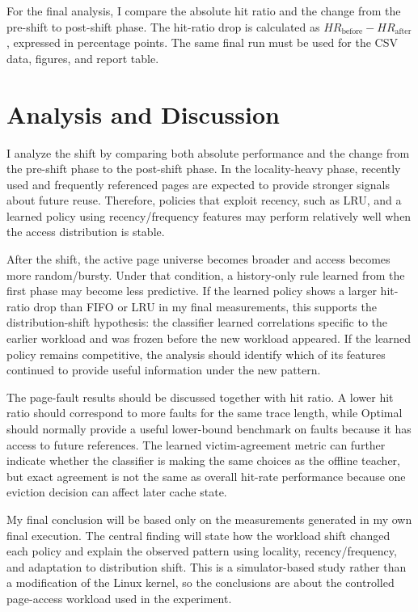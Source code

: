 \documentclass[10pt]{article}
\begin{document}
For the final analysis, I compare the absolute hit ratio and the change from the pre-shift to post-shift phase. The hit-ratio drop is calculated as $HR_{\mathrm{before}}-HR_{\mathrm{after}}$, expressed in percentage points. The same final run must be used for the CSV data, figures, and report table.

\section{Analysis and Discussion}
I analyze the shift by comparing both absolute performance and the change from the pre-shift phase to the post-shift phase. In the locality-heavy phase, recently used and frequently referenced pages are expected to provide stronger signals about future reuse. Therefore, policies that exploit recency, such as LRU, and a learned policy using recency/frequency features may perform relatively well when the access distribution is stable.

After the shift, the active page universe becomes broader and access becomes more random/bursty. Under that condition, a history-only rule learned from the first phase may become less predictive. If the learned policy shows a larger hit-ratio drop than FIFO or LRU in my final measurements, this supports the distribution-shift hypothesis: the classifier learned correlations specific to the earlier workload and was frozen before the new workload appeared. If the learned policy remains competitive, the analysis should identify which of its features continued to provide useful information under the new pattern.

The page-fault results should be discussed together with hit ratio. A lower hit ratio should correspond to more faults for the same trace length, while Optimal should normally provide a useful lower-bound benchmark on faults because it has access to future references. The learned victim-agreement metric can further indicate whether the classifier is making the same choices as the offline teacher, but exact agreement is not the same as overall hit-rate performance because one eviction decision can affect later cache state.

My final conclusion will be based only on the measurements generated in my own final execution. The central finding will state how the workload shift changed each policy and explain the observed pattern using locality, recency/frequency, and adaptation to distribution shift. This is a simulator-based study rather than a modification of the Linux kernel, so the conclusions are about the controlled page-access workload used in the experiment.
\end{document}
